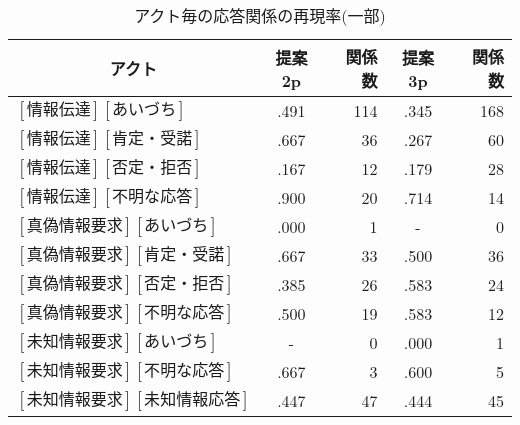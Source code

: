 \begin{table}[tbt]
\small
  \begin{center}
    \caption{アクト毎の応答関係の再現率(一部)}
    \label{tbl:res5.2.2}
    \begin{tabular}{|l|c|r||c|r|}
      \hline
       \multicolumn{1}{|c|}{アクト} & 提案2p & 関係数 & 提案3p & 関係数\\
      \hline
      $[情報伝達][あいづち]$		&.491&114	&.345&168\\
      $[情報伝達][肯定・受諾]$		&.667&36	&.267&60\\
      $[情報伝達][否定・拒否]$		&.167&12	&.179&28\\
      $[情報伝達][不明な応答]$		&.900&20	&.714&14\\
      $[真偽情報要求][あいづち]$	&.000&1	&-&0\\
      $[真偽情報要求][肯定・受諾]$	&.667&33	&.500&36\\
      $[真偽情報要求][否定・拒否]$	&.385&26	&.583&24\\
      $[真偽情報要求][不明な応答]$	&.500&19	&.583&12\\
      $[未知情報要求][あいづち]$	&-&0	&.000&1\\
      $[未知情報要求][不明な応答]$	&.667&3	&.600&5\\
      $[未知情報要求][未知情報応答]$	&.447&47	&.444&45\\
      \hline
    \end{tabular}
  \end{center}
\end{table}

